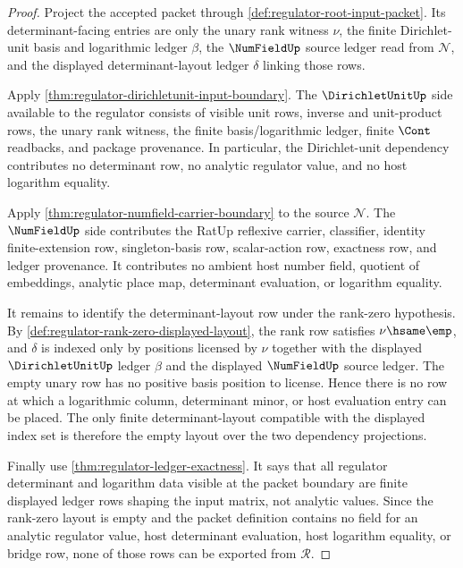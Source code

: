 \begin{proof}
Project the accepted packet through
\autoref{def:regulator-root-input-packet}. Its determinant-facing entries are
only the unary rank witness $\nu$, the finite Dirichlet-unit basis and
logarithmic ledger $\beta$, the $\NumFieldUp$ source ledger read from
$\mathcal{N}$, and the displayed determinant-layout ledger $\delta$ linking
those rows.

Apply \autoref{thm:regulator-dirichletunit-input-boundary}. The
$\DirichletUnitUp$ side available to the regulator consists of visible unit
rows, inverse and unit-product rows, the unary rank witness, the finite
basis/logarithmic ledger, finite $\Cont$ readbacks, and package provenance. In
particular, the Dirichlet-unit dependency contributes no determinant row, no
analytic regulator value, and no host logarithm equality.

Apply \autoref{thm:regulator-numfield-carrier-boundary} to the source
$\mathcal{N}$. The $\NumFieldUp$ side contributes the RatUp reflexive carrier,
classifier, identity finite-extension row, singleton-basis row, scalar-action
row, exactness row, and ledger provenance. It contributes no ambient host
number field, quotient of embeddings, analytic place map, determinant
evaluation, or logarithm equality.

It remains to identify the determinant-layout row under the rank-zero
hypothesis. By \autoref{def:regulator-rank-zero-displayed-layout}, the rank
row satisfies $\nu\hsame\emp$, and $\delta$ is indexed only by positions
licensed by $\nu$ together with the displayed $\DirichletUnitUp$ ledger
$\beta$ and the displayed $\NumFieldUp$ source ledger. The empty unary row has
no positive basis position to license. Hence there is no row at which a
logarithmic column, determinant minor, or host evaluation entry can be placed.
The only finite determinant-layout compatible with the displayed index set is
therefore the empty layout over the two dependency projections.

Finally use \autoref{thm:regulator-ledger-exactness}. It says that all
regulator determinant and logarithm data visible at the packet boundary are
finite displayed ledger rows shaping the input matrix, not analytic values.
Since the rank-zero layout is empty and the packet definition contains no
field for an analytic regulator value, host determinant evaluation, host
logarithm equality, or bridge row, none of those rows can be exported from
$\mathcal{R}$.
\end{proof}
